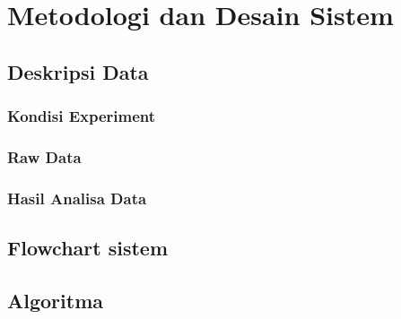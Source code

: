 \chapter{Metodologi dan Desain Sistem}
\section{Deskripsi Data}
\subsection{Kondisi Experiment}
\subsection{Raw Data}
\subsection{Hasil Analisa Data}
\section{Flowchart sistem}
\section{Algoritma}
